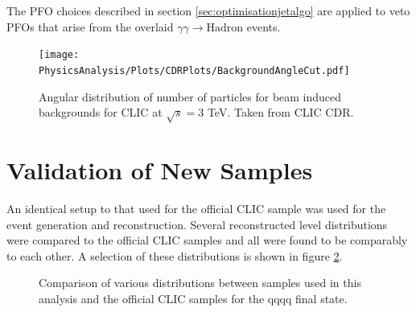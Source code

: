 The PFO choices described in section \ref{sec:optimisationjetalgo} are applied to veto PFOs that arise from the overlaid $\gamma\gamma \rightarrow \text{Hadron}$ events.

\begin{figure}
\texttt{[image: PhysicsAnalysis/Plots/CDRPlots/BackgroundAngleCut.pdf]}
\caption[]{Angular distribution of number of particles for beam induced backgrounds for CLIC at $\sqrt{s} = 3$ TeV.  Taken from CLIC CDR.}
\label{fig:backgroundangle}
\end{figure}

\section{Validation of New Samples}
An identical setup to that used for the official CLIC sample was used for the event generation and reconstruction. Several reconstructed level distributions were compared to the official CLIC samples and all were found to be comparably to each other. A selection of these distributions is shown in figure \ref{fig:cliccomp}.

\begin{figure}
\centering
{}
\caption[Comparison of various distributions between samples used in this analysis and the official CLIC samples for the \nu{\nu}qqqq final state.]{Comparison of various distributions between samples used in this analysis and the official CLIC samples for the \nu{\nu}qqqq final state.}
\label{fig:cliccomp}
\end{figure}

